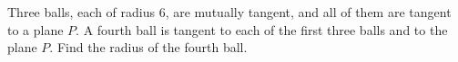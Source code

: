 Three balls, each of radius $6$, are mutually tangent, and all of them are tangent to a plane $P$. A fourth ball is tangent to each of the first three balls and to the plane $P$. Find the radius of the fourth ball.
